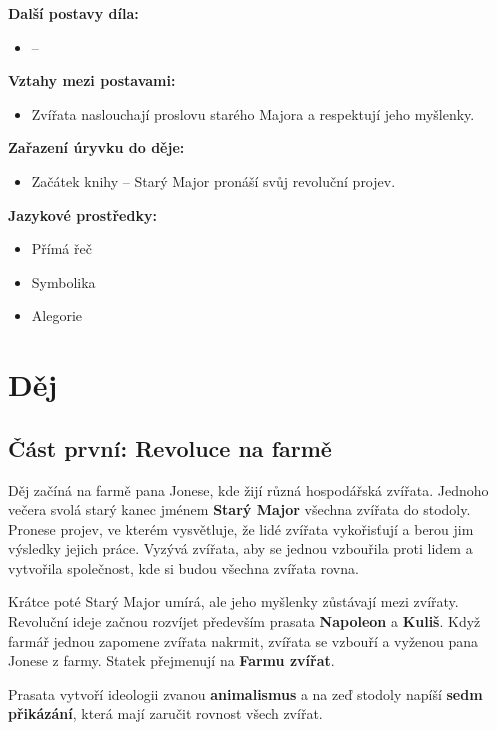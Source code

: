 \documentclass[12pt,a4paper]{article}
\begin{document}
\begin{tcolorbox}[breakable]
\textbf{Další postavy díla:}
\begin{itemize}
\item --
\end{itemize}

\textbf{Vztahy mezi postavami:}
\begin{itemize}
\item Zvířata naslouchají proslovu starého Majora a respektují jeho myšlenky.
\end{itemize}

\textbf{Zařazení úryvku do děje:}
\begin{itemize}
\item Začátek knihy – Starý Major pronáší svůj revoluční projev.
\end{itemize}

\textbf{Jazykové prostředky:}
\begin{itemize}
\item Přímá řeč
\item Symbolika
\item Alegorie
\end{itemize}

\end{tcolorbox}

\section*{Děj}

\subsection*{Část první: Revoluce na farmě}

Děj začíná na farmě pana Jonese, kde žijí různá hospodářská zvířata. Jednoho večera svolá starý kanec jménem \textbf{Starý Major} všechna zvířata do stodoly. Pronese projev, ve kterém vysvětluje, že lidé zvířata vykořisťují a berou jim výsledky jejich práce. Vyzývá zvířata, aby se jednou vzbouřila proti lidem a vytvořila společnost, kde si budou všechna zvířata rovna.  

Krátce poté Starý Major umírá, ale jeho myšlenky zůstávají mezi zvířaty. Revoluční ideje začnou rozvíjet především prasata \textbf{Napoleon} a \textbf{Kuliš}. Když farmář jednou zapomene zvířata nakrmit, zvířata se vzbouří a vyženou pana Jonese z farmy. Statek přejmenují na \textbf{Farmu zvířat}.  

Prasata vytvoří ideologii zvanou \textbf{animalismus} a na zeď stodoly napíší \textbf{sedm přikázání}, která mají zaručit rovnost všech zvířat.
\end{document}
